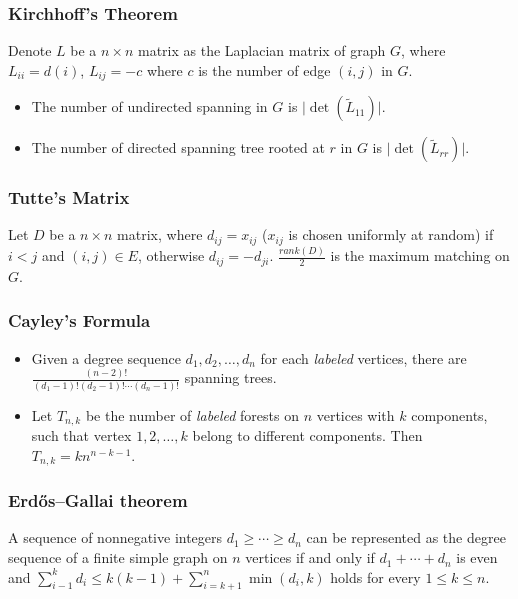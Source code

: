 \subsubsection{Kirchhoff's Theorem}
Denote $L$ be a $n \times n$ matrix as the Laplacian matrix of graph $G$, where $L_{ii} = d(i)$, $L_{ij} = -c$ where $c$ is the number of edge $(i, j)$ in $G$.
\begin{itemize}
    \itemsep-0.5em
    \item The number of undirected spanning in $G$ is $\lvert \det(\tilde{L}_{11}) \rvert$.
    \item The number of directed spanning tree rooted at $r$ in $G$ is $\lvert \det(\tilde{L}_{rr}) \rvert$.
\end{itemize}

\subsubsection{Tutte's Matrix}
Let $D$ be a $n \times n$ matrix, where $d_{ij} = x_{ij}$ ($x_{ij}$ is chosen uniformly at random) if $i < j$ and $(i, j) \in E$, otherwise $d_{ij} = -d_{ji}$. $\frac{rank(D)}{2}$ is the maximum matching on $G$.

\subsubsection{Cayley's Formula}
\begin{itemize}
    \itemsep-0.5em
  \item Given a degree sequence $d_1, d_2, \ldots, d_n$ for each \textit{labeled} vertices, there are $\frac{(n - 2)!}{(d_1 - 1)!(d_2 - 1)!\cdots(d_n - 1)!}$ spanning trees.
  \item Let $T_{n, k}$ be the number of \textit{labeled} forests on $n$ vertices with $k$ components, such that vertex $1, 2, \ldots, k$ belong to different components. Then $T_{n, k} = kn^{n - k - 1}$.
\end{itemize}

\subsubsection{Erdős–Gallai theorem}
A sequence of nonnegative integers $d_1\ge\cdots\ge d_n$ can be represented as the degree sequence of a finite simple graph on $n$ vertices if and only if $d_1+\cdots+d_n$ is even and $\displaystyle\sum_{i-1}^kd_i\le k(k-1)+\displaystyle\sum_{i=k+1}^n\min(d_i,k)$ holds for every $1\le k\le n$.

